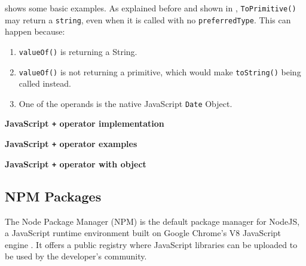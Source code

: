  shows some basic examples. As explained before and shown in , \texttt{ToPrimitive()} may return a \texttt{string}, even when it is called with no \texttt{preferredType}. This can happen because:
\begin{enumerate}
	\item \texttt{valueOf()} is returning a String.
	\item \texttt{valueOf()} is not returning a primitive, which would make \texttt{toString()} being called instead.
	\item One of the operands is the native JavaScript \texttt{Date} Object.
\end{enumerate}

\begin{code}
	\captionsetup{aboveskip=0pt, belowskip=10pt}
	\caption[JavaScript + operator implementation]{\textbf{JavaScript \texttt{+} operator implementation}}
	\label{code:background-plus-operator-implementation}
\end{code}

\begin{code}
	\captionsetup{aboveskip=0pt, belowskip=10pt}
	\caption[JavaScript + operator examples]{\textbf{JavaScript \texttt{+} operator examples}}
	\label{code:background-plus-operator-simple-examples}
\end{code}

\begin{code}
	\captionsetup{aboveskip=0pt, belowskip=10pt}
	\caption[JavaScript + operator with object]{\textbf{JavaScript \texttt{+} operator with object}}
	\label{code:background-plus-operator-object-example}
\end{code}


\subsection{NPM Packages} \label{sec:background-npm-packages}
The Node Package Manager (NPM) is the default package manager for NodeJS, a JavaScript runtime environment built on Google Chrome's V8 JavaScript engine \citep{nodejs}. It offers a public registry where JavaScript libraries can be uploaded to be used by the developer's community.

